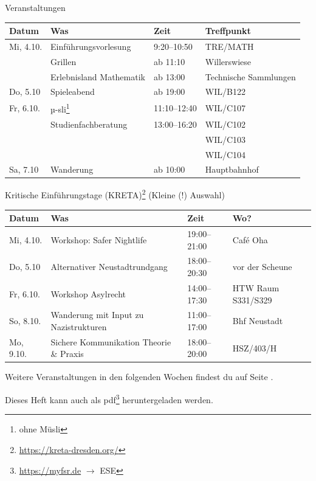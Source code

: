 \documentclass{scrartcl}
\begin{document}
{\begin{center}
    \begin{Large}
      Veranstaltungen
    \end{Large}\vspace{1em}
    \begin{tabular}{llll}
      Datum        & Was & Zeit & Treffpunkt \\
      \hline
      Mi, 4.10. & Einführungsvorlesung    & 9:20--10:50 & TRE/MATH  \\
        & Grillen & ab 11:10 & Willerswiese \\
        & Erlebnisland Mathematik & ab 13:00 & Technische Sammlungen \\
      \hline
      Do, 5.10 & Spieleabend  & ab 19:00 & WIL/B122 \\
      \hline
      Fr, 6.10. & µ-sli\footnote{ohne Müsli}  & 11:10--12:40 & WIL/C107 \\
                     & Studienfachberatung  & 13:00--16:20 & WIL/C102 \\
                     & & & WIL/C103 \\
                     & & & WIL/C104 \\
      \hline
      Sa, 7.10 & Wanderung & ab 10:00 & Hauptbahnhof
    \end{tabular}
  \begin{Large}
    Kritische Einführungstage (KRETA)\footnote{\url{https://kreta-dresden.org/}} (Kleine (!) Auswahl)
  \end{Large}
  \begin{tabular}{lp{}lp{}}
      Datum        & Was & Zeit & Wo? \\
      \hline
      Mi, 4.10. & Workshop: Safer Nightlife    & 19:00--21:00 & Café Oha \\
      Do, 5.10 & Alternativer Neustadtrundgang & 18:00--20:30 & vor der Scheune \\
      Fr, 6.10. & Workshop Asylrecht  & 14:00--17:30 & HTW Raum S331/S329 \\
      So, 8.10. & Wanderung mit Input zu Nazistrukturen & 11:00--17:00 & Bhf Neustadt \\
      Mo, 9.10. & Sichere Kommunikation Theorie \& Praxis & 18:00--20:00 & HSZ/403/H
    \end{tabular}
  \end{center}
  Weitere Veranstaltungen in den folgenden Wochen findest du auf Seite \pageref{sec:termine}.
  \vfill
  \begin{small}
    Dieses Heft kann auch als pdf\footnote{\url{https://myfsr.de} $\rightarrow$ ESE} heruntergeladen werden.
  \end{small}
  \newpage
}
\end{document}
